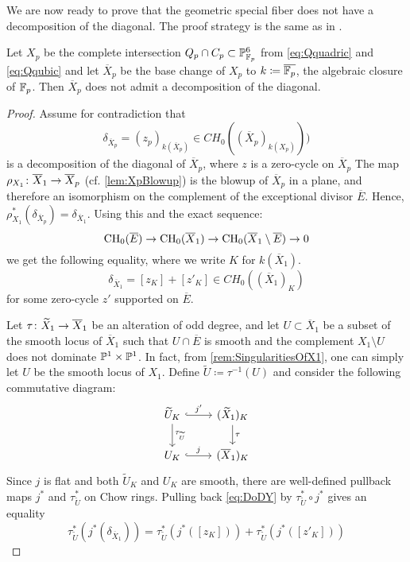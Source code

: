 We are now ready to prove that the geometric special fiber does not have a decomposition of the diagonal. The proof strategy is the same as in \cite[Proposition 3.1]{SchreiederHypersurface}.

\begin{proposition}
 \label{lem:NoDoD}
	Let $X_p$ be the complete intersection $Q_p \cap C_p \subset \P_{\F_p}^6$ from \eqref{eq:Qquadric} and \eqref{eq:Qqubic} and let $\overline{X}_p$ be the base change of $X_p$ to $k  \coloneqq \overline{\F_p}$, the algebraic closure of $\F_p$. Then $\overline{X}_p$ does not admit a decomposition of the diagonal.
\end{proposition}
\begin{proof}
Assume for contradiction that 
	\[\delta_{\overline{X}_p} = (z_p)_{k({\overline{X}_p})} \in CH_0(({\overline{X}_p})_{k({X_p})}))\]
	is a decomposition of the diagonal of $\overline{X}_p$, where $z$ is a zero-cycle on $\overline{X}_p$ The map $\rho_{X_1} \from \overline{X}_1 \to \overline{X}_p$ (cf. \cref{lem:XpBlowup}) is the blowup of $\overline{X}_p$ in a plane, and therefore an isomorphism on the complement of the exceptional divisor $\overline{E}$. Hence, $\rho_{X_1}^*(\delta_{\overline{X}_p}) = \delta_{\overline{X}_1}$. Using this and the exact sequence:
\[\CH_0(\overline{E}) \to \CH_0(\overline{X}_1) \to \CH_0(\overline{X}_1 \setminus \overline{E}) \to 0\]
 we get the following equality, where we write $K$ for $k(\overline{X}_1)$.
	\begin{equation}
		\label{eq:DoDY}
		\delta_{\overline{X}_1} = [z_K] + [z'_K] \in CH_0((\overline{X}_1)_K)
	\end{equation}
	for some zero-cycle $z'$ supported on $\overline{E}$.
	
	Let $\tau \from \widetilde{X}_1 \to \overline{X}_1$ be an alteration of odd degree, and let $U \subset \overline{X}_1$ be a subset of the smooth locus of $\overline{X}_1$ such that $U \cap \overline{E}$ is smooth and the complement $X_1 \setminus U$ does not dominate $\P^1 \times \P^1$. In fact, from \cref{rem:SingularitiesOfX1}, one can simply let $U$ be the smooth locus of $X_1$. Define $\widetilde{U} \coloneqq \tau^{-1}(U)$ and consider the following commutative diagram:
        \[
          \begin{tikzcd}
            \widetilde{U}_{K} \arrow[hookrightarrow,"j'"]{r} \arrow["\tau_{\widetilde{U}}"]{d} & (\widetilde{X}_1)_{K} \arrow["\tau"]{d}\\
            U_K \arrow[hookrightarrow,"j"]{r}& (\overline{X}_1)_{K}
          \end{tikzcd}
        \]
        Since $j$ is flat and both $\widetilde{U}_{K}$ and $U_{K}$ are smooth, there are well-defined pullback maps $j^*$ and $\tau_{\widetilde{U}}^*$ on Chow rings. Pulling back \eqref{eq:DoDY} by $\tau_{\widetilde{U}}^* \circ j^*$ gives an equality
        \begin{equation}
          \tau_{\widetilde{U}}^*(j^*(\delta_{\overline{X}_1})) = \tau_{\widetilde{U}}^*(j^*([z_{K}])) + \tau_{\widetilde{U}}^*(j^*([z'_{K}]))
        \end{equation}


\end{proof}

